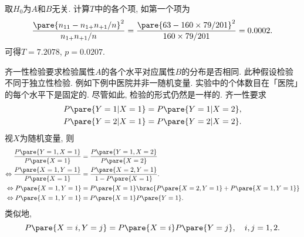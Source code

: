 \documentclass[../Statistics.tex]{subfiles}
\begin{document}
\begin{sample}
    \begin{solution}
        取$H_0$为$A$和$B$无关. 计算$T$中的各个项, 如第一个项为
        \[ \frac{\pare{n_{11} - n_{1+}n_{+1}/n}^2}{n_{1+}n_{+1}/n} = \frac{\pare{63 - 160 \times 79/201}^2}{160\times 79 / 201} = 0.0002. \]
        可得$T = 7.2078$, $p = 0.0207$.
    \end{solution}
\end{sample}
\par
齐一性检验要求检验属性$A$的各个水平对应属性$B$的分布是否相同. 此种假设检验不同于独立性检验. 例如下例中医院并非一随机变量. 实验中的个体数目在「医院」的每个水平下是固定的. 尽管如此, 检验的形式仍然是一样的. 齐一性要求
\begin{align*}
    P\pare{Y=1\vert X=1} &= P\pare{Y=1\vert X=2}, \\ P\pare{Y=2\vert X=1} &= P\pare{Y=2\vert X=2}.
\end{align*}
视$X$为随机变量, 则
\begin{align*}
    \frac{P\pare{Y=1,X=1}}{P\pare{X=1}} &= \frac{P\pare{Y=1,X=2}}{P\pare{X=2}} \\ \Leftrightarrow \frac{P\pare{X=1,Y=1}}{P\pare{X=1}} &= \frac{P\pare{X=2,Y=1}}{1-P\pare{X=1}}. \\
    \Leftrightarrow P\pare{X=1,Y=1} &= P\pare{X=1}\brac{P\pare{X=2,Y=1} + P\pare{X=1,Y=1}} \\
    \Leftrightarrow P\pare{X=1,Y=1} &= P\pare{X=1}P\pare{Y=1}.
\end{align*}
类似地,
\[ P\pare{X=i,Y=j} = P\pare{X=i}P\pare{Y=j},\quad i,j = 1,2. \]
\end{document}
